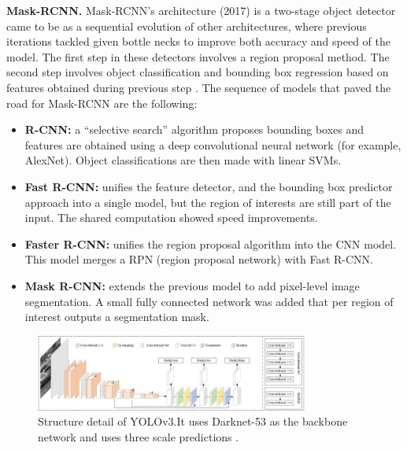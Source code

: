 \textbf{Mask-RCNN.}
Mask-RCNN's architecture (2017) is a two-stage object detector came to be as a sequential evolution of other architectures,
where previous iterations tackled given bottle necks to improve both accuracy and speed of the model. The first step in these detectors involves a region proposal method. The second step involves object classification and bounding box regression based on features obtained during previous step \cite{visoai2021detection}. The sequence of models that paved the road for Mask-RCNN are the following:
\begin{itemize}
    \item \textbf{R-CNN:} a “selective search” algorithm proposes bounding boxes and features are obtained using a deep convolutional neural network (for example, AlexNet). Object classifications are then made with linear SVMs.
    \item \textbf{Fast R-CNN:} unifies the feature detector, and the bounding box predictor approach into a single model, but the region of interests are still part of the input. The shared computation showed speed improvements.
    \item \textbf{Faster R-CNN:} unifies the region proposal algorithm into the CNN model. This model merges a RPN (region proposal network) with Fast R-CNN.
    \item \textbf{Mask R-CNN:} extends the previous model to add pixel-level image segmentation. A small fully connected network was added that per region of interest outputs a segmentation mask.
\end{itemize}


\begin{figure}[!ht]
        \centering
        \includegraphics[width=0.8\textwidth]{images/yolov3.jpg}
        \caption{Structure detail of YOLOv3.It uses Darknet-53 as the backbone network and uses three scale predictions \cite{visoai2021detection}.}
        \label{fig:yolov3}
    \end{figure}
    
